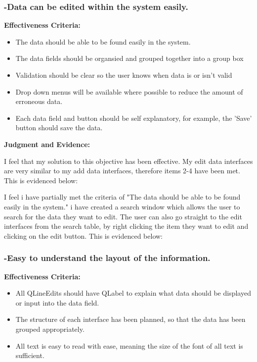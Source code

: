 \subsubsection{-Data can be edited within the system easily.}

\textbf{Effectiveness Criteria:}\newline
\begin{itemize}
	\item{The data should be able to be found easily in the system.}
	\item{The data fields should be organsied and grouped together into a group box}
	\item{Validation should be clear so the user knows when data is or isn't valid}
	\item{Drop down menus will be available where possible to reduce the amount of erroneous data.}
	\item{Each data field and button should be self explanatory, for example, the 'Save' button should save the data.}
\end{itemize}

\textbf{Judgment and Evidence:} \newline

I feel that my solution to this objective has been effective. My edit data interfaces are very similar to my add data interfaces, therefore items 2-4 have been met. This is evidenced below:


I feel i have partially met the criteria of "The data should be able to be found easily in the system." i have created a search window which allows the user to search for the data they want to edit. The user can also go straight to the edit interfaces from the search table, by right clicking the item they want to edit and clicking on the edit button. This is evidenced below:






\subsubsection{-Easy to understand the layout of the information.}

\textbf{Effectiveness Criteria:}\newline
\begin{itemize}
	\item{All QLineEdits should have QLabel to explain what data should be displayed or input into the data field.}
	\item{The structure of each interface has been planned, so that the data has been grouped appropriately.}
	\item{All text is easy to read with ease, meaning the size of the font of all text is sufficient.}
\end{itemize}

